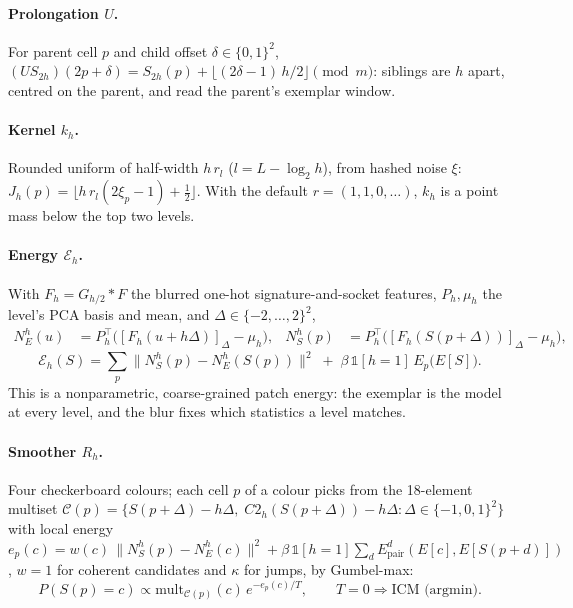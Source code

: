 \documentclass[11pt]{article}
\newcommand{\1}{\mathds{1}}
\begin{document}
\paragraph{Prolongation $U$.} For parent cell $p$ and child offset $\delta \in \{0,1\}^2$,
$(U S_{2h})(2p+\delta) = S_{2h}(p) + \lfloor (2\delta - 1)\,h/2 \rfloor \pmod m$: siblings are
$h$ apart, centred on the parent, and read the parent's exemplar window.

\paragraph{Kernel $k_h$.} Rounded uniform of half-width $h\,r_l$ ($l = L - \log_2 h$), from
hashed noise $\xi$: $J_h(p) = \lfloor h\, r_l (2\xi_p - 1) + \tfrac12 \rfloor$. With the
default $r = (1,1,0,\dots)$, $k_h$ is a point mass below the top two levels.

\paragraph{Energy $\mathcal{E}_h$.} With $F_h = G_{h/2} * F$ the blurred one-hot
signature-and-socket features, $P_h,\mu_h$ the level's PCA basis and mean, and
$\Delta \in \{-2,\dots,2\}^2$,
\begin{align*}
  N_E^h(u) &= P_h^\top\big([F_h(u + h\Delta)]_\Delta - \mu_h\big), &
  N_S^h(p) &= P_h^\top\big([F_h(S(p+\Delta))]_\Delta - \mu_h\big),
\end{align*}
\[
  \mathcal{E}_h(S) = \sum_p \big\| N_S^h(p) - N_E^h(S(p)) \big\|^2
  \;+\; \beta\,\1[h=1]\, E_p\big(E[S]\big).
\]
This is a nonparametric, coarse-grained patch energy: the exemplar is the model at every
level, and the blur fixes which statistics a level matches.

\paragraph{Smoother $R_h$.} Four checkerboard colours; each cell $p$ of a colour picks from
the 18-element multiset
$\mathcal{C}(p) = \{S(p+\Delta) - h\Delta,\; C2_h(S(p+\Delta)) - h\Delta : \Delta \in \{-1,0,1\}^2\}$
with local energy
$e_p(c) = w(c)\,\|N_S^h(p) - N_E^h(c)\|^2 + \beta\,\1[h=1]\sum_d E^d_{\mathrm{pair}}(E[c], E[S(p+d)])$,
$w = 1$ for coherent candidates and $\kappa$ for jumps, by Gumbel-max:
\[
  P(S(p) = c) \propto \mathrm{mult}_{\mathcal{C}(p)}(c)\,e^{-e_p(c)/T},
  \qquad T = 0 \Rightarrow \text{ICM (argmin)}.
\]
\end{document}
